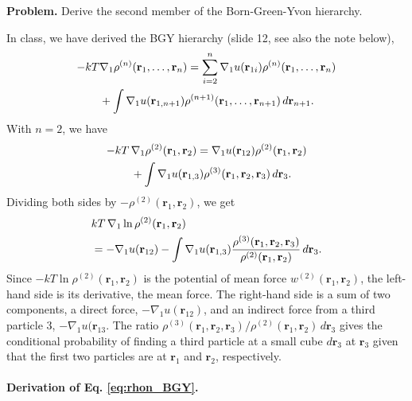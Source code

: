 \documentclass[twocolumn, 10pt]{article}
\numberwithin{equation}{section}
\newenvironment{problem}
{\par\medskip \color{problemblue}
  \textbf{Problem. }\ignorespaces}
{\medskip}
\newenvironment{solution}[1][\empty]
{\par\medskip\sffamily
  \textbf{\ifx\empty#1{Solution.}\relax\else{#1}\fi} \ignorespaces}
{\medskip}
\begin{document}
\begin{problem}
  Derive the second member of the Born-Green-Yvon hierarchy.
\end{problem}

\begin{solution}
In class, we have derived the BGY hierarchy (slide 12, see also the note below),
\begin{align}
  -kT &\nabla_1\rho^{(n)}(\mathbf r_1, \dots, \mathbf r_n)
  =
  \sum_{i=2}^n \nabla_1 u(\mathbf r_{1i})
  \rho^{(n)}(\mathbf r_1, \dots, \mathbf r_n)
  \notag
  \\
  &+ \int
  \nabla_1 u(\mathbf r_{1, n+1})
  \rho^{(n+1)}(\mathbf r_1, \dots, \mathbf r_{n+1}) \,
  d\mathbf r_{n+1}
  .
  \label{eq:rhon_BGY}
\end{align}
%
With $n = 2$, we have
\begin{align}
  -kT \, & \nabla_1\rho^{(2)}(\mathbf r_1, \mathbf r_2)
  =
  \nabla_1 u(\mathbf r_{12})
  \rho^{(2)}(\mathbf r_1, \mathbf r_2)
  \notag \\
  &+
  \int
  \nabla_1 u(\mathbf r_{1, 3})
  \rho^{(3)}(\mathbf r_1, \mathbf r_2, \mathbf r_{3}) \,
  d\mathbf r_3
  .
  \notag
\end{align}
%
Dividing both sides by $-\rho^{(2)}(\mathbf r_1, \mathbf r_2)$, we get
\begin{align}
  &kT \, \nabla_1 \ln \rho^{(2)}(\mathbf r_1, \mathbf r_2)
  \notag \\
  &=
  -\nabla_1 u(\mathbf r_{12})
  -
  \int
  \nabla_1 u(\mathbf r_{1, 3})
    \frac{
      \rho^{(3)}(\mathbf r_1, \mathbf r_2, \mathbf r_{3})
    }{
      \rho^{(2)}(\mathbf r_1, \mathbf r_2)
    }
    \,
    d\mathbf r_3
  .
  \label{eq:BGY2a}
\end{align}
%
Since $-kT\ln\rho^{(2)}(\mathbf r_1, \mathbf r_2)$
is the potential of mean force
$w^{(2)}(\mathbf r_1, \mathbf r_2)$,
the left-hand side is its derivative, the mean force.
%
The right-hand side is a sum of two components,
a direct force, $-\nabla_1 u(\mathbf r_{12})$,
and an indirect force
from a third particle $3$, $-\nabla_1 u(\mathbf r_{13}$.
%
The ratio
$\rho^{(3)}(\mathbf r_1, \mathbf r_2, \mathbf r_3)/\rho^{(2)}(\mathbf r_1, \mathbf r_2) \, d\mathbf r_3$
gives the conditional probability of finding a third particle at
a small cube $d\mathbf r_3$ at $\mathbf r_3$
given that the first two particles are at $\mathbf r_1$ and $\mathbf r_2$, respectively.


\paragraph*{Derivation of Eq. \eqref{eq:rhon_BGY}.}


\end{solution}
\end{document}
